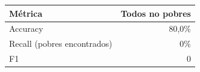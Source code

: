 
\begin{tabular}{lr}
\toprule
Métrica & Todos no pobres\\
\midrule
Accuracy & 80,0\%\\
Recall (pobres encontrados) & 0\%\\
F1 & 0\\
\bottomrule
\end{tabular}
